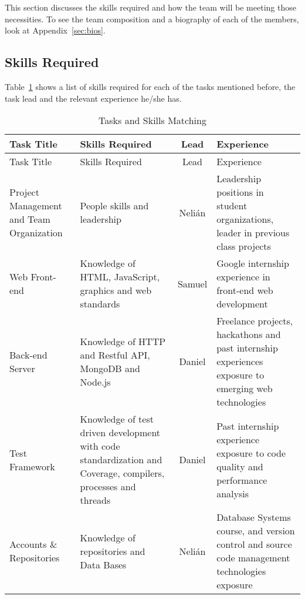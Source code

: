 
This section discusses the skills required and how  the team will be meeting
those necessities. To see the team composition and a biography of each of
the members, look at Appendix~\ref{sec:bios}.

\subsection{Skills Required}

Table~\ref{skills} shows a list of skills required for each of the tasks mentioned before, the task lead and the relevant experience he/she has.

\begin{center}
\setlength{\extrarowheight}{1.5pt}
  \begin{longtable}{|m{3cm}|m{5cm}|c|m{5cm}|}
 \caption{Tasks and Skills Matching \label{skills}} \\
   \hline
  
  \centering Task Title & Skills Required & Lead & Experience \\
  \hline \hline \endfirsthead
  
     \hline

	\centering Task Title & Skills Required & Lead & Experience \\  
	\hline \hline \endhead
  
  \endfoot  
  
  Project Management and Team Organization & People skills and leadership & Nelián & Leadership positions in student organizations, leader in previous class projects\\ \hline
  Web Front-end & Knowledge of HTML, JavaScript, graphics and web standards & Samuel & Google internship experience in front-end web development\\ \hline
  Back-end Server & Knowledge of HTTP and Restful API, MongoDB and Node.js & Daniel & Freelance projects, hackathons and past internship experiences exposure to emerging web technologies \\ \hline
  Test Framework & Knowledge of test driven development with code standardization and Coverage, compilers, processes and threads & Daniel & Past internship experience exposure to code quality and performance analysis\\ \hline
  Accounts \& Repositories & Knowledge of repositories and Data Bases & Nelián & Database Systems course, and version control and source code management
technologies exposure\\ \hline
   \end{longtable}
\end{center}

